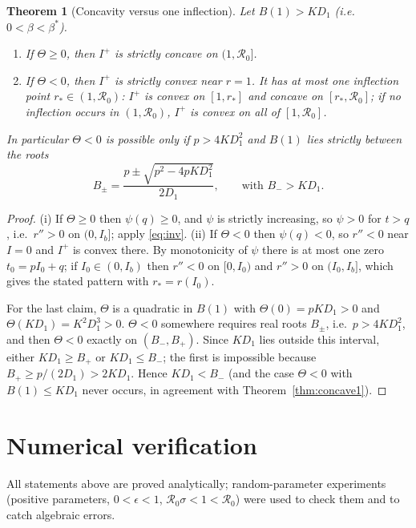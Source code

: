\documentclass[11pt]{article}
\newtheorem{theorem}[lemma]{Theorem}
\theoremstyle{remark}
\newcommand{\R}{\mathcal R_0}
\begin{document}
\begin{theorem}[Concavity versus one inflection]\label{thm:dichotomy}
Let $B(1)>KD_1$ (i.e.\ $0<\beta<\beta^*$).
\begin{enumerate}
\item[(i)] If $\Theta\ge0$, then $I^+$ is strictly concave on $(1,\R]$.
\item[(ii)] If $\Theta<0$, then $I^+$ is strictly convex near $r=1$. It has at most one inflection point $r_*\in(1,\R)$: $I^+$ is convex on $[1,r_*]$ and concave on $[r_*,\R]$; if no inflection occurs in $(1,\R)$, $I^+$ is convex on all of $[1,\R]$.
\end{enumerate}
In particular $\Theta<0$ is possible only if $p>4KD_1^2$ and $B(1)$ lies strictly between the roots
\[
B_\pm=\frac{p\pm\sqrt{p^2-4pKD_1^2}}{2D_1},\qquad\text{with }B_->KD_1 .
\]
\end{theorem}
\begin{proof}
(i) If $\Theta\ge0$ then $\psi(q)\ge0$, and $\psi$ is strictly increasing, so $\psi>0$ for $t>q$, i.e.\ $r''>0$ on $(0,I_b]$; apply \eqref{eq:inv}. (ii) If $\Theta<0$ then $\psi(q)<0$, so $r''<0$ near $I=0$ and $I^+$ is convex there. By monotonicity of $\psi$ there is at most one zero $t_0=pI_0+q$; if $I_0\in(0,I_b)$ then $r''<0$ on $[0,I_0)$ and $r''>0$ on $(I_0,I_b]$, which gives the stated pattern with $r_*=r(I_0)$.

For the last claim, $\Theta$ is a quadratic in $B(1)$ with $\Theta(0)=pKD_1>0$ and $\Theta(KD_1)=K^2D_1^3>0$. $\Theta<0$ somewhere requires real roots $B_\pm$, i.e.\ $p>4KD_1^2$, and then $\Theta<0$ exactly on $(B_-,B_+)$. Since $KD_1$ lies outside this interval, either $KD_1\ge B_+$ or $KD_1\le B_-$; the first is impossible because $B_+\ge p/(2D_1)>2KD_1$. Hence $KD_1<B_-$ (and the case $\Theta<0$ with $B(1)\le KD_1$ never occurs, in agreement with Theorem~\ref{thm:concave1}).
\end{proof}

\section{Numerical verification}\label{sec:numerics}

All statements above are proved analytically; random-parameter experiments (positive parameters, $0<\epsilon<1$, $\R\sigma<1<\R$) were used to check them and to catch algebraic errors.
\end{document}
